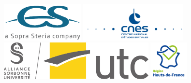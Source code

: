 \begin{titlepage}
\begin{center}
        \begin{figure}[h!]
            \begin{minipage}{0.24\linewidth}
                \vspace{0.6cm}
                \centering\includegraphics[height=2cm]{Images/General/Logo_CS.png}
            \end{minipage}
            \begin{minipage}{0.25\linewidth}
                \centering\includegraphics[height=2cm]{Images/General/Logo_CNES.png}
            \end{minipage}
            \begin{minipage}{0.25\linewidth}
                \vspace{0.6cm}
                \centering\includegraphics[height=2cm]{Images/General/Logo_UTC.jpg}
            \end{minipage}
            \begin{minipage}{0.24\linewidth}
                \vspace{0.5cm}
                \centering\includegraphics[height=2cm]{Images/General/Logo Région HDF.png}
            \end{minipage}
        \end{figure}
    \end{center}
\end{titlepage}